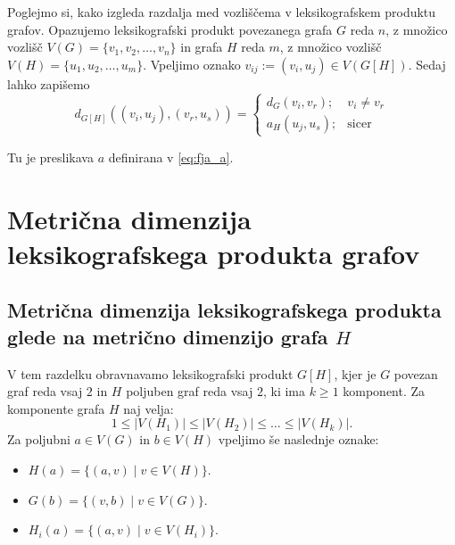 \documentclass[mat1, tisk]{fmfdelo}
\newcommand{\1}{(1, 1, \ldots, 1)}
\newcommand{\2}{(2, 2, \ldots, 2)}
\begin{document}
Poglejmo si, kako izgleda razdalja med vozliščema v leksikografskem produktu grafov. 
Opazujemo leksikografski produkt povezanega grafa $G$ reda $n$, z množico vozlišč
$V(G) = \{v_1, v_2, \ldots , v_n \}$ in grafa $H$ reda $m$, z množico vozlišč 
$V(H) = \{u_1, u_2, \ldots , u_m \}$. Vpeljimo oznako 
$v_{ij} := (v_i, u_j) \in V(G[H]).$
Sedaj lahko zapišemo
\begin{equation} \label{eq:razdalja_produkta}
    d_{G[H]}((v_i, u_j), (v_r, u_s)) = 
    \begin{cases}
        d_G(v_i, v_r); & v_i \neq v_r \\
        a_H(u_j, u_s); & \text{sicer}
    \end{cases}
\end{equation} 

Tu je preslikava $a$ definirana v \eqref{eq:fja_a}.




\section{Metrična dimenzija leksikografskega produkta grafov}\label{s:mdim_prod}



\subsection{Metrična dimenzija leksikografskega produkta glede na metrično 
dimenzijo grafa $H$} \label{ss:mdim_komp_prod}

V tem razdelku obravnavamo leksikografski produkt $G[H]$, kjer je $G$ povezan graf reda vsaj $2$ 
in $H$ poljuben graf reda vsaj $2$, ki ima $k\geq 1$ komponent. Za komponente grafa $H$ naj velja:
$$1 \leq |V(H_1)| \leq |V(H_2)| \leq \ldots \leq |V(H_k)|.$$ 
Za poljubni $a \in V(G)$ in $b \in V(H)$ vpeljimo še naslednje oznake:
\begin{itemize}
    \item $H(a) = \{ (a, v) \; | \; v \in V(H) \}$.
    \item $G(b) = \{ (v, b) \; | \; v \in V(G) \}$.
    \item $H_i(a) = \{ (a, v) \; | \; v \in V(H_i) \}$.
\end{itemize}
\end{document}
